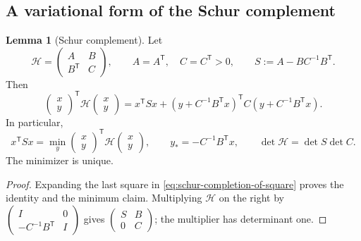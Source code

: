\documentclass[10pt,reqno]{amsart}
\theoremstyle{definition}
\newtheorem{lemma}[definition]{Lemma}
\theoremstyle{remark}
\numberwithin{equation}{section}
\numberwithin{figure}{section}
\begin{document}
\subsection{A variational form of the Schur complement}
\begin{lemma}[Schur complement]\label{lem:schur-complement}
Let
\begin{equation}\label{eq:schur-complement-definition}
\mathcal H=\begin{pmatrix}A&B\\B^{\mathsf T}&C\end{pmatrix},\qquad
A=A^{\mathsf T},\quad C=C^{\mathsf T}>0,\qquad
S:=A-BC^{-1}B^{\mathsf T}.
\end{equation}
Then
\begin{equation}\label{eq:schur-completion-of-square}
\begin{pmatrix}x\\y\end{pmatrix}^{\mathsf T}
\mathcal H\begin{pmatrix}x\\y\end{pmatrix}
=x^{\mathsf T}Sx+
(y+C^{-1}B^{\mathsf T}x)^{\mathsf T}
C(y+C^{-1}B^{\mathsf T}x).
\end{equation}
In particular,
\begin{equation}\label{eq:schur-variational-form}
x^{\mathsf T}Sx
=\min_y\begin{pmatrix}x\\y\end{pmatrix}^{\mathsf T}
\mathcal H\begin{pmatrix}x\\y\end{pmatrix},\qquad
y_*=-C^{-1}B^{\mathsf T}x,\qquad
\det\mathcal H=\det S\det C.
\end{equation}
The minimizer is unique.
\end{lemma}
\begin{proof}
Expanding the last square in
\eqref{eq:schur-completion-of-square} proves the identity and the
minimum claim. Multiplying $\mathcal H$ on the right by
$\left(\begin{smallmatrix}I&0\\-C^{-1}B^{\mathsf T}&I\end{smallmatrix}\right)$
gives $\left(\begin{smallmatrix}S&B\\0&C\end{smallmatrix}\right)$;
the multiplier has determinant one.
\end{proof}
\end{document}
